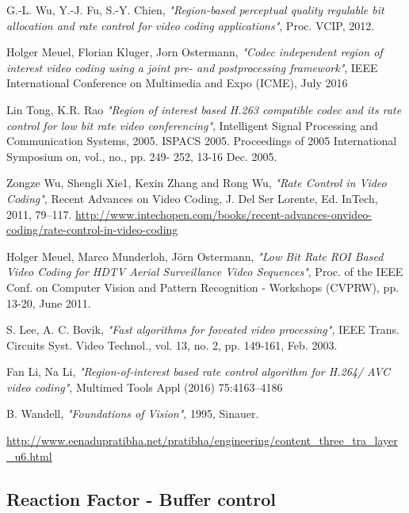 \documentclass[11pt]{article} %
\begin{document}
\begin{thebibliography}{9}
G.-L. Wu, Y.-J. Fu, S.-Y. Chien, \textit{"Region-based perceptual quality regulable bit allocation and rate control for video coding applications"},
Proc. VCIP, 2012.

Holger Meuel, Florian Kluger, Jorn Ostermann, \textit{"Codec independent region of interest video coding using a joint pre- and postprocessing framework"}, 
IEEE International Conference on Multimedia and Expo (ICME), July 2016

Lin Tong, K.R. Rao \textit{"Region of interest based H.263 compatible codec and its rate control for low bit rate video conferencing"}, 
Intelligent Signal Processing and Communication Systems, 2005. ISPACS 2005. Proceedings of 2005 International Symposium on, vol., no., pp. 249- 252, 13-16 Dec. 2005.

Zongze Wu, Shengli Xie1, Kexin Zhang and Rong Wu, \textit{"Rate Control in Video Coding"},
Recent Advances on Video Coding, J. Del Ser Lorente, Ed. InTech,
2011, 79–117. \url{http://www.intechopen.com/books/recent-advances-onvideo-coding/rate-control-in-video-coding}

Holger Meuel, Marco Munderloh, Jörn Ostermann, \textit{"Low Bit Rate ROI Based Video Coding for HDTV Aerial Surveillance Video Sequences"}, 
Proc. of the IEEE Conf. on Computer Vision and Pattern Recognition - Workshops (CVPRW), pp. 13-20, June 2011.

S. Lee, A. C. Bovik, \textit{"Fast algorithms for foveated video processing"},
IEEE Trans. Circuits Syst. Video Technol., vol. 13, no. 2, pp. 149-161, Feb. 2003.

Fan Li, Na Li, \textit{"Region-of-interest based rate control algorithm for H.264/
AVC video coding"},
Multimed Tools Appl (2016) 75:4163–4186
 
B. Wandell, \textit{"Foundations of Vision"}, 1995, Sinauer.

\url{http://www.eenadupratibha.net/pratibha/engineering/content_three_tra_layer_u6.html}
\end{thebibliography}

\subsection{Reaction Factor - Buffer control} 
\end{document}
